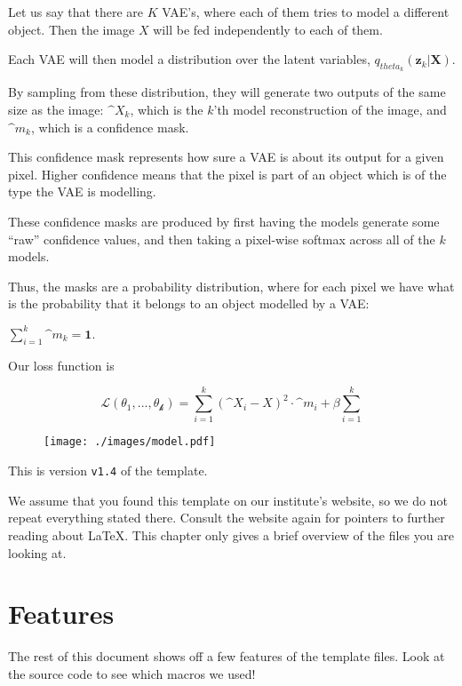 Let us say that there are $K$ VAE's, where each of them tries to model a
different object.
Then the image $X$ will be fed independently to
each of them.

Each VAE will then model a distribution over the latent variables,
$q_{theta_k}(\textbf{z}_k | \textbf{X})$.

By sampling from these distribution, they will generate two outputs of
the same size as the image: $\^{X}_{k}$, which is the $k$'th model
reconstruction of the image, and $\^{m}_{k}$, which is a confidence mask.

This confidence mask represents how sure a VAE is about its output for a given
pixel. Higher confidence means that the pixel is part of an object which is of
the type the VAE is modelling.

These confidence masks are produced by first having the models generate some
``raw'' confidence values, and then taking a pixel-wise softmax across all of
the $k$ models.

Thus, the masks are a probability distribution, where for each pixel we have
what is the probability that it belongs to an object modelled by a VAE:

$\sum_{i = 1}^{k} \^{m}_{k} = \textbf{1}$.

Our loss function is

\[
  \mathcal{L(\theta_1, ..., \theta_k)} =
  \sum_{i = 1}^{k} (\^{X}_{i} - X)^2 \cdot \^{m}_{i}
  +
  \beta \sum_{i = 1}^{k}
\]

\begin{figure}[htbp]
  \texttt{[image: ./images/model.pdf]}
\end{figure}

This is version \verb-v1.4- of the template.

We assume that you found this template on our institute's website, so
we do not repeat everything stated there.  Consult the website again
for pointers to further reading about \LaTeX{}.  This chapter only
gives a brief overview of the files you are looking at.

\section{Features}
\label{sec:features}

The rest of this document shows off a few features of the template
files.  Look at the source code to see which macros we used!


